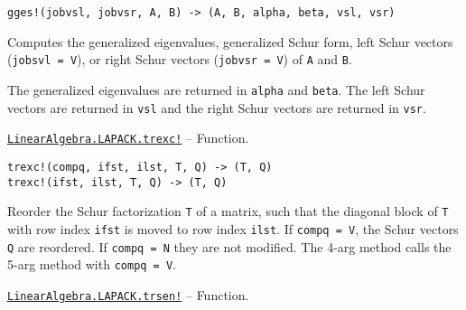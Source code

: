 \begin{adjustwidth}{2em}{0pt}


\begin{verbatim}
gges!(jobvsl, jobvsr, A, B) -> (A, B, alpha, beta, vsl, vsr)
\end{verbatim}

Computes the generalized eigenvalues, generalized Schur form, left Schur vectors (\texttt{jobsvl = V}), or right Schur vectors (\texttt{jobvsr = V}) of \texttt{A} and \texttt{B}.

The generalized eigenvalues are returned in \texttt{alpha} and \texttt{beta}. The left Schur vectors are returned in \texttt{vsl} and the right Schur vectors are returned in \texttt{vsr}.



\end{adjustwidth}
\hypertarget{16392841550634697146}{}
\hyperlink{16392841550634697146}{\texttt{LinearAlgebra.LAPACK.trexc!}}  -- {Function.}

\begin{adjustwidth}{2em}{0pt}


\begin{verbatim}
trexc!(compq, ifst, ilst, T, Q) -> (T, Q)
trexc!(ifst, ilst, T, Q) -> (T, Q)
\end{verbatim}

Reorder the Schur factorization \texttt{T} of a matrix, such that the diagonal block of \texttt{T} with row index \texttt{ifst} is moved to row index \texttt{ilst}. If \texttt{compq = V}, the Schur vectors \texttt{Q} are reordered. If \texttt{compq = N} they are not modified. The 4-arg method calls the 5-arg method with \texttt{compq = V}.



\end{adjustwidth}
\hypertarget{14222318539033253394}{}
\hyperlink{14222318539033253394}{\texttt{LinearAlgebra.LAPACK.trsen!}}  -- {Function.}

